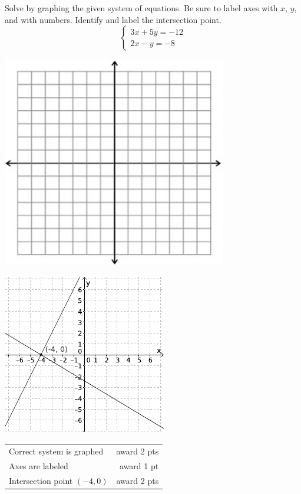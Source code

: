{
	Solve by graphing the given system of equations. Be sure to label axes with $x$, $y$, and with numbers. Identify and label the intersection point.
	$$\begin{cases} 3x+5y=-12\\ 2x-y=-8\end{cases}$$ \begin{onlyproblem}\begin{center}\includegraphics{fig-graphpaper.png}\end{center}\end{onlyproblem} \begin{onlysolution}\begin{center}\includegraphics{fig095-10-a-answer}\end{center}\end{onlysolution}
	
}
{
	\begin{tabular}{l r}
	Correct system is graphed & award 2 pts\\
	Axes are labeled & award 1 pt\\
	Intersection point $(-4,0)$ & award 2 pts
	\end{tabular}
}

